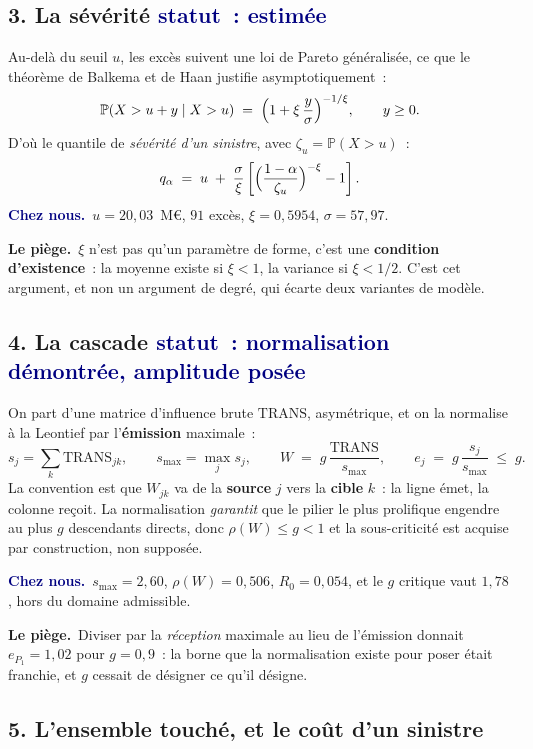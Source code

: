 \documentclass[11pt,a4paper]{article}
\newcommand{\cheznous}[1]{\smallskip\noindent\textcolor{navy}{\textbf{Chez nous.}}\ #1\par}
\newcommand{\lepiege}[1]{\smallskip\noindent\textcolor{accent}{\textbf{Le piège.}}\ #1\par}
\begin{document}
\subsection*{3. La sévérité \quad\small\textcolor{navy}{statut~: estimée}\normalsize}

Au-delà du seuil $u$, les excès suivent une loi de Pareto généralisée, ce que le théorème de
Balkema et de Haan justifie asymptotiquement~:
\[
\mathbb{P}(X>u+y \mid X>u) \;=\; \Bigl(1+\xi\,\frac{y}{\sigma}\Bigr)^{-1/\xi},
\qquad y\ge 0 .
\]
D'où le quantile de \emph{sévérité d'un sinistre}, avec $\zeta_u=\mathbb{P}(X>u)$~:
\[
q_\alpha \;=\; u \;+\; \frac{\sigma}{\xi}
\left[\Bigl(\frac{1-\alpha}{\zeta_u}\Bigr)^{-\xi}-1\right].
\]
\cheznous{$u=20{,}03$~M\euro, $91$ excès, $\xi=0{,}5954$, $\sigma=57{,}97$.}
\lepiege{$\xi$ n'est pas qu'un paramètre de forme, c'est une \textbf{condition d'existence}~: la
moyenne existe si $\xi<1$, la variance si $\xi<1/2$. C'est cet argument, et non un argument de
degré, qui écarte deux variantes de modèle.}

\subsection*{4. La cascade \quad\small\textcolor{navy}{statut~: normalisation démontrée, amplitude posée}\normalsize}

On part d'une matrice d'influence brute $\mathrm{TRANS}$, asymétrique, et on la normalise à la
Leontief par l'\textbf{émission} maximale~:
\[
s_j=\sum_k \mathrm{TRANS}_{jk}, \qquad s_{\max}=\max_j s_j, \qquad
W \;=\; g\,\frac{\mathrm{TRANS}}{s_{\max}}, \qquad
e_j \;=\; g\,\frac{s_j}{s_{\max}} \;\le\; g .
\]
\noindent La convention est que $W_{jk}$ va de la \textbf{source} $j$ vers la \textbf{cible} $k$~:
la ligne émet, la colonne reçoit. La normalisation \emph{garantit} que le pilier le plus prolifique
engendre au plus $g$ descendants directs, donc $\rho(W)\le g<1$ et la sous-criticité est acquise
par construction, non supposée.

\cheznous{$s_{\max}=2{,}60$, $\rho(W)=0{,}506$, $R_0=0{,}054$, et le $g$ critique vaut $1{,}78$,
hors du domaine admissible.}
\lepiege{Diviser par la \emph{réception} maximale au lieu de l'émission donnait $e_{P_1}=1{,}02$
pour $g=0{,}9$~: la borne que la normalisation existe pour poser était franchie, et $g$ cessait de
désigner ce qu'il désigne.}

\subsection*{5. L'ensemble touché, et le coût d'un sinistre}
\end{document}
